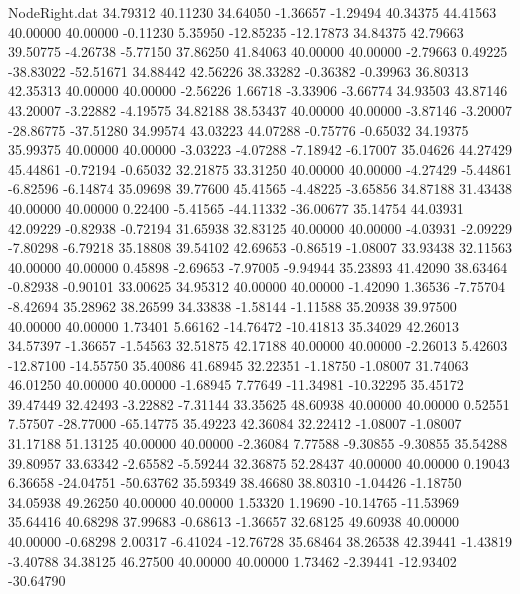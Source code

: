\begin{filecontents}{NodeRight.dat}
  34.79312   40.11230   34.64050    -1.36657   -1.29494   40.34375   44.41563   40.00000   40.00000   -0.11230    5.35950  -12.85235  -12.17873
  34.84375   42.79663   39.50775    -4.26738   -5.77150   37.86250   41.84063   40.00000   40.00000   -2.79663    0.49225  -38.83022  -52.51671
  34.88442   42.56226   38.33282    -0.36382   -0.39963   36.80313   42.35313   40.00000   40.00000   -2.56226    1.66718   -3.33906   -3.66774
  34.93503   43.87146   43.20007    -3.22882   -4.19575   34.82188   38.53437   40.00000   40.00000   -3.87146   -3.20007  -28.86775  -37.51280
  34.99574   43.03223   44.07288    -0.75776   -0.65032   34.19375   35.99375   40.00000   40.00000   -3.03223   -4.07288   -7.18942   -6.17007
  35.04626   44.27429   45.44861    -0.72194   -0.65032   32.21875   33.31250   40.00000   40.00000   -4.27429   -5.44861   -6.82596   -6.14874
  35.09698   39.77600   45.41565    -4.48225   -3.65856   34.87188   31.43438   40.00000   40.00000    0.22400   -5.41565  -44.11332  -36.00677
  35.14754   44.03931   42.09229    -0.82938   -0.72194   31.65938   32.83125   40.00000   40.00000   -4.03931   -2.09229   -7.80298   -6.79218
  35.18808   39.54102   42.69653    -0.86519   -1.08007   33.93438   32.11563   40.00000   40.00000    0.45898   -2.69653   -7.97005   -9.94944
  35.23893   41.42090   38.63464    -0.82938   -0.90101   33.00625   34.95312   40.00000   40.00000   -1.42090    1.36536   -7.75704   -8.42694
  35.28962   38.26599   34.33838    -1.58144   -1.11588   35.20938   39.97500   40.00000   40.00000    1.73401    5.66162  -14.76472  -10.41813
  35.34029   42.26013   34.57397    -1.36657   -1.54563   32.51875   42.17188   40.00000   40.00000   -2.26013    5.42603  -12.87100  -14.55750
  35.40086   41.68945   32.22351    -1.18750   -1.08007   31.74063   46.01250   40.00000   40.00000   -1.68945    7.77649  -11.34981  -10.32295
  35.45172   39.47449   32.42493    -3.22882   -7.31144   33.35625   48.60938   40.00000   40.00000    0.52551    7.57507  -28.77000  -65.14775
  35.49223   42.36084   32.22412    -1.08007   -1.08007   31.17188   51.13125   40.00000   40.00000   -2.36084    7.77588   -9.30855   -9.30855
  35.54288   39.80957   33.63342    -2.65582   -5.59244   32.36875   52.28437   40.00000   40.00000    0.19043    6.36658  -24.04751  -50.63762
  35.59349   38.46680   38.80310    -1.04426   -1.18750   34.05938   49.26250   40.00000   40.00000    1.53320    1.19690  -10.14765  -11.53969
  35.64416   40.68298   37.99683    -0.68613   -1.36657   32.68125   49.60938   40.00000   40.00000   -0.68298    2.00317   -6.41024  -12.76728
  35.68464   38.26538   42.39441    -1.43819   -3.40788   34.38125   46.27500   40.00000   40.00000    1.73462   -2.39441  -12.93402  -30.64790

\end{filecontents}
